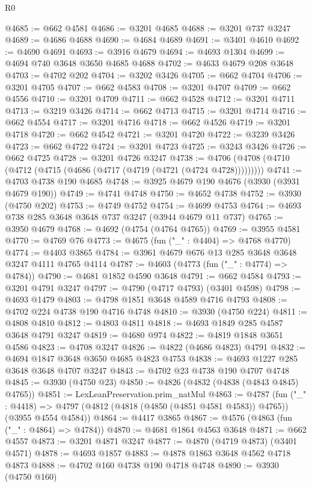 \begin{lexlean}{R0}
\begin{coremodule}
@4685 := @662 @4581
@4686 := @3201 @4685
@4688 := @3201 @737 @3247
@4689 := @4686 @4688
@4690 := @4684 @4689
@4691 := @3401 @4610
@4692 := @4690 @4691
@4693 := @3916 @4679
@4694 := @4693 @1304
@4699 := @4694 @740 @3648 @3650 @4685 @4688
@4702 := @4633 @4679 @208 @3648
@4703 := @4702 @202
@4704 := @3202 @3426
@4705 := @662 @4704
@4706 := @3201 @4705
@4707 := @662 @4583
@4708 := @3201 @4707
@4709 := @662 @4556
@4710 := @3201 @4709
@4711 := @662 @4528
@4712 := @3201 @4711
@4713 := @3219 @3426
@4714 := @662 @4713
@4715 := @3201 @4714
@4716 := @662 @4554
@4717 := @3201 @4716
@4718 := @662 @4526
@4719 := @3201 @4718
@4720 := @662 @4542
@4721 := @3201 @4720
@4722 := @3239 @3426
@4723 := @662 @4722
@4724 := @3201 @4723
@4725 := @3243 @3426
@4726 := @662 @4725
@4728 := @3201 @4726 @3247
@4738 := @4706 (@4708 (@4710 (@4712 (@4715 (@4686 (@4717 (@4719 (@4721 (@4724 @4728)))))))))
@4741 := @4703 @4738 @190 @4685
@4748 := @3925 @4679 @190 @4676 (@3930 (@3931 @4679 @190))
@4749 := @4741 @4748
@4750 := @4652 @4738
@4752 := @3930 (@4750 @202)
@4753 := @4749 @4752
@4754 := @4699 @4753
@4764 := @4693 @738 @285 @3648 @3648 @737 @3247 (@3944 @4679 @11 @737)
@4765 := @3950 @4679
@4768 := @4692 (@4754 (@4764 @4765))
@4769 := @3955 @4581
@4770 := @4769 @76
@4773 := @4675 (fun ("_" : @4404) => @4768 @4770)
@4774 := @4403 @3865
@4784 := @3961 @4679 @676 @13 @285 @3648 @3648 @3247 @4111 @4765 @4114
@4787 := @4603 (@4773 (fun ("_" : @4774) => @4784))
@4790 := @4681 @1852 @4590 @3648
@4791 := @662 @4584
@4793 := @3201 @4791 @3247
@4797 := @4790 (@4717 @4793) (@3401 @4598)
@4798 := @4693 @1479
@4803 := @4798 @1851 @3648 @4589 @4716 @4793
@4808 := @4702 @224 @4738 @190 @4716 @4748
@4810 := @3930 (@4750 @224)
@4811 := @4808 @4810
@4812 := @4803 @4811
@4818 := @4693 @1849 @285 @4587 @3648 @4791 @3247
@4819 := @4680 @974
@4822 := @4819 @1848 @3651 @4586
@4823 := @4708 @3247
@4826 := @4822 (@4686 @4823) @4791
@4832 := @4694 @1847 @3648 @3650 @4685 @4823 @4753
@4838 := @4693 @1227 @285 @3648 @3648 @4707 @3247
@4843 := @4702 @23 @4738 @190 @4707 @4748
@4845 := @3930 (@4750 @23)
@4850 := @4826 (@4832 (@4838 (@4843 @4845) @4765))
@4851 := LexLeanPreservation.prim_natMul
@4863 := @4787
    (fun ("_" : @4418) =>
    @4797 (@4812 (@4818 (@4850 (@4851 @4581 @4583)) @4765)) (@3955 @4554 @4584))
@4864 := @4417 @3865
@4867 := @4576 (@4863 (fun ("_" : @4864) => @4784))
@4870 := @4681 @1864 @4563 @3648
@4871 := @662 @4557
@4873 := @3201 @4871 @3247
@4877 := @4870 (@4719 @4873) (@3401 @4571)
@4878 := @4693 @1857
@4883 := @4878 @1863 @3648 @4562 @4718 @4873
@4888 := @4702 @160 @4738 @190 @4718 @4748
@4890 := @3930 (@4750 @160)

\end{coremodule}
\end{lexlean}

